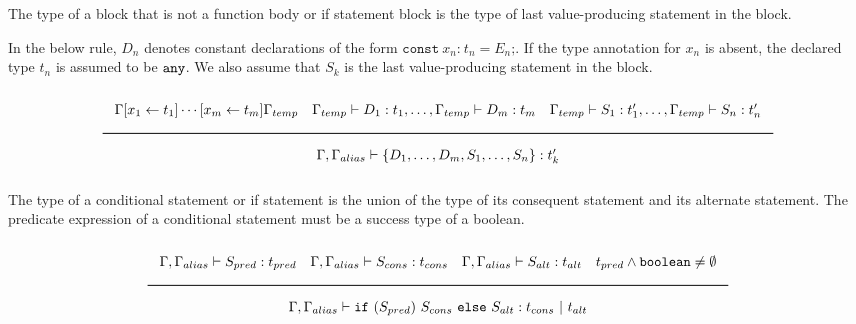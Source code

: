 The type of a block that is not a function body or if statement block is the type of last value-producing statement in the block.

In the below rule, $D_n$ denotes constant declarations of the form $\texttt{const}\ x_n \texttt{:}\ t_n = E_n\texttt{;}$.
If the type annotation for $x_n$ is absent, the declared type $t_n$ is assumed to be $\texttt{any}$.
We also assume that $S_k$ is the last value-producing statement in the block.

\noindent
\[
  \Rule{\Gamma [x_1 \leftarrow t_1] \cdots [x_m \leftarrow t_m] \Gamma_{temp} \quad
    \Gamma_{temp} \vdash D_1 : t_1, \ldots, \Gamma_{temp} \vdash D_m : t_m \quad
    \Gamma_{temp} \vdash S_1 : t'_1, \ldots, \Gamma_{temp} \vdash S_n : t'_n
    }{\Gamma, \Gamma_{alias} \vdash \{ D_1, \ldots, D_m, S_1, \ldots, S_n\} : t'_k}
\]
\noindent

The type of a conditional statement or if statement is the union of the type of its consequent statement and its alternate statement.
The predicate expression of a conditional statement must be a success type of a boolean.

\noindent
\[
  \Rule{\Gamma, \Gamma_{alias} \vdash S_{pred} : t_{pred} \quad \Gamma, \Gamma_{alias} \vdash S_{cons} : t_{cons} \quad \Gamma, \Gamma_{alias} \vdash S_{alt} : t_{alt}
    \quad t_{pred} \wedge \Bool \neq \emptyset}{\Gamma, \Gamma_{alias} \vdash \texttt{if}\ (S_{pred})\ S_{cons}\
    \texttt{else}\ S_{alt} : t_{cons}\ |\ t_{alt}}
\]
\noindent

